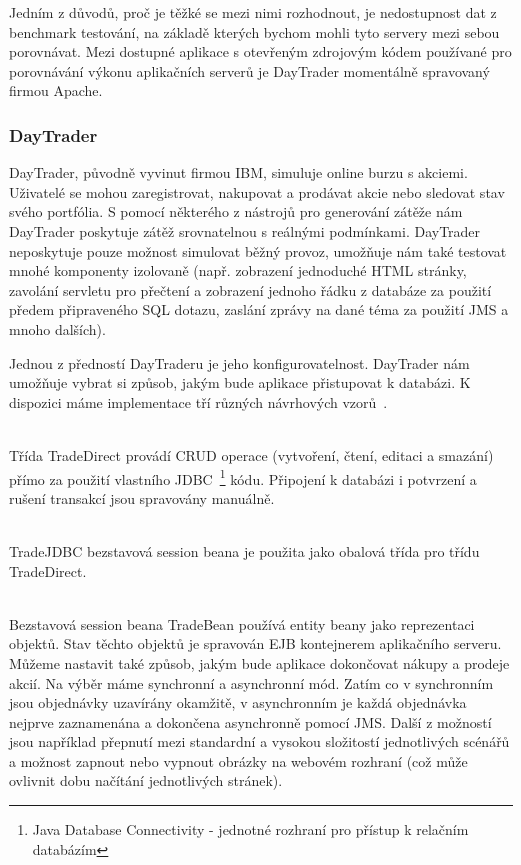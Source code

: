 \documentclass[122pt,oneside]{fithesis}
\begin{document}
Jedním z důvodů, proč je těžké se mezi nimi rozhodnout, je nedostupnost dat z benchmark testování, na základě kterých bychom mohli tyto servery mezi sebou porovnávat. Mezi dostupné aplikace s otevřeným zdrojovým kódem používané pro porovnávání výkonu aplikačních serverů je DayTrader momentálně spravovaný firmou Apache. 

\subsubsection{DayTrader}
DayTrader, původně vyvinut firmou IBM, simuluje online burzu s akciemi. Uživatelé se mohou zaregistrovat, nakupovat a prodávat akcie nebo sledovat stav svého portfólia. S pomocí některého z nástrojů pro generování zátěže nám DayTrader poskytuje zátěž srovnatelnou s reálnými podmínkami. DayTrader neposkytuje pouze možnost simulovat běžný provoz, umožňuje nám také testovat mnohé komponenty izolovaně (např. zobrazení jednoduché HTML stránky, zavolání servletu pro přečtení a zobrazení jednoho řádku z databáze za použití předem připraveného SQL dotazu, zaslání zprávy na dané téma za použití JMS a mnoho dalších). 

Jednou z předností DayTraderu je jeho konfigurovatelnost. DayTrader nám umožňuje vybrat si způsob, jakým bude aplikace přistupovat k databázi. K dispozici máme implementace tří různých návrhových vzorů~\cite{daytrader}.

\vspace{5 mm}
\\\indent Třída TradeDirect provádí CRUD operace (vytvoření, čtení, editaci a smazání) přímo za použití vlastního JDBC~\footnote{Java Database Connectivity - jednotné rozhraní pro přístup k relačním databázím} kódu. Připojení k databázi i potvrzení a rušení transakcí jsou spravovány manuálně.

\vspace{5 mm}
\\\indent TradeJDBC bezstavová session beana je použita jako obalová třída pro třídu TradeDirect.

\vspace{5 mm}
\\\indent Bezstavová session beana TradeBean používá entity beany jako reprezentaci objektů. Stav těchto objektů je spravován EJB kontejnerem aplikačního serveru.
\newline
\\\indent Můžeme nastavit také způsob, jakým bude aplikace dokončovat nákupy a prodeje akcií. Na výběr máme synchronní a asynchronní mód. Zatím co v synchronním jsou objednávky uzavírány okamžitě, v asynchronním je každá objednávka nejprve zaznamenána a dokončena asynchronně pomocí JMS. Další z možností jsou například přepnutí mezi standardní a vysokou složitostí jednotlivých scénářů a možnost zapnout nebo vypnout obrázky na webovém rozhraní (což může ovlivnit dobu načítání jednotlivých stránek).
\end{document}
